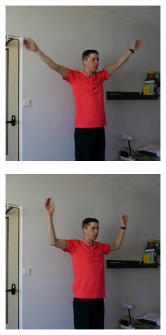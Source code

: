 \begin{figure}[!ht]
\begin{subfigure}[b]{0.24\textwidth}
    \end{subfigure}
    \begin{subfigure}[b]{0.24\textwidth}
        \includegraphics[width=\linewidth]{figures/optical_flow/frame000001127.png}
    \end{subfigure}
    \begin{subfigure}[b]{0.24\textwidth}
        \includegraphics[width=\linewidth]{figures/optical_flow/frame000001664.png}

\end{subfigure}
\end{figure}

